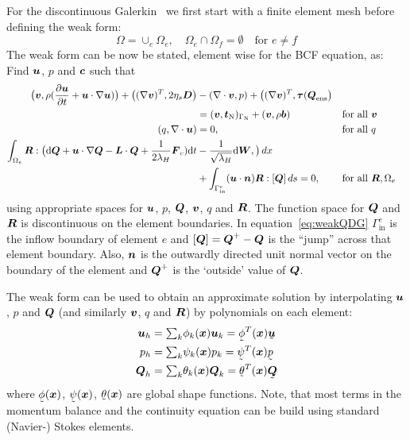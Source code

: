 For the discontinuous Galerkin \fem\ we first start with a finite element mesh
before defining the weak form:
\[
\Omega=\cup_e\Omega_e, \quad\Omega_{e}\cap\Omega_{f}=\emptyset\quad
   \text{for }e\neq f
\]
The weak form can be now be stated, element wise for the BCF equation,
as:
Find $\boldsymbol{u}$, $p$ and $\boldsymbol{c}$ such that
\begin{alignat}{2}
 \big(\boldsymbol{v},\rho(\dfrac{\partial \boldsymbol{u}}{\partial t}+\boldsymbol{u}\cdot\nabla\boldsymbol{u})\big) +
  \big((\nabla\boldsymbol{v})^T,2\eta_s\boldsymbol{D}\big)
    &-(\nabla\cdot\boldsymbol{v},p)+\big((\nabla\boldsymbol{v})^T,\boldsymbol{\tau}(\boldsymbol{Q}_\text{ens}\big)\notag\\
    &=(\boldsymbol{v},\boldsymbol{t}_{\text{N}})_{\Gamma_{\text{N}}}+(\boldsymbol{v},\rho\boldsymbol{b})
&&\text{for all }\boldsymbol{v}\\
  \,(q,\nabla\cdot\boldsymbol{u})&=0,&&\text{for all }q\\
 \int_{\Omega_e}\boldsymbol{R}:\big(
 \mathrm{d}\boldsymbol{Q} +\boldsymbol{u}\cdot\nabla\boldsymbol{Q}-\boldsymbol{L}\cdot\boldsymbol{Q} + \frac{1}{2\lambda_H}\boldsymbol{F}_c)
    \mathrm{d}t&-\frac{1}{\sqrt{\lambda_H}}\mathrm{d}\boldsymbol{W},
\big)\,d x\notag\\
    &+\int_{\Gamma^e_{\text{in}}}(\boldsymbol{u}\cdot\boldsymbol{n})\boldsymbol{R}:[\boldsymbol{Q}]\,d s = 0,
  &&\text{for all }\boldsymbol{R},\Omega_e
   \label{eq:weakQDG}
\end{alignat}
using appropriate spaces for $\boldsymbol{u}$, $p$, $\boldsymbol{Q}$, $\boldsymbol{v}$, $q$ and 
$\boldsymbol{R}$.
The function space for $\boldsymbol{Q}$ and $\boldsymbol{R}$ is discontinuous on the
element boundaries.
In equation~\eqref{eq:weakQDG} $\Gamma^e_{\text{in}}$ is the
inflow boundary of element $e$ and
$[\boldsymbol{Q}]=\boldsymbol{Q}^+-\boldsymbol{Q}$ is the ``jump'' across that element boundary.
Also, $\boldsymbol{n}$ is the outwardly directed unit normal vector on the boundary of
the element and $\boldsymbol{Q}^+$ is
the `outside' value of $\boldsymbol{Q}$.

The weak form can be used to obtain an approximate solution
by interpolating $\boldsymbol{u}$, $p$ and $\boldsymbol{Q}$ 
(and similarly $\boldsymbol{v}$, $q$ and $\boldsymbol{R}$) by
polynomials on each element:
\begin{align}
    \vek u_h&=\tsum_k \phi_k(\vek x)\vek u_k=\col\phi^T(\vek x)\col{\vek u}\\
    p_h&=\tsum_k \psi_k(\vek x) p_k=\col\psi^T(\vek x)\col{ p} \\
  \ten Q_h&=\tsum_k \theta_k(\vek x)\vek Q_k=\col\theta^T(\vek x)\col{\vek Q}
  \label{eq:thetaQDG}
\end{align}
where $\col\phi(\vek x)$, $\col\psi(\vek x)$, $\col\theta(\vek x)$
are global shape functions. Note, that most terms in the momentum balance and
the continuity equation can be build using standard (Navier-) Stokes elements.

